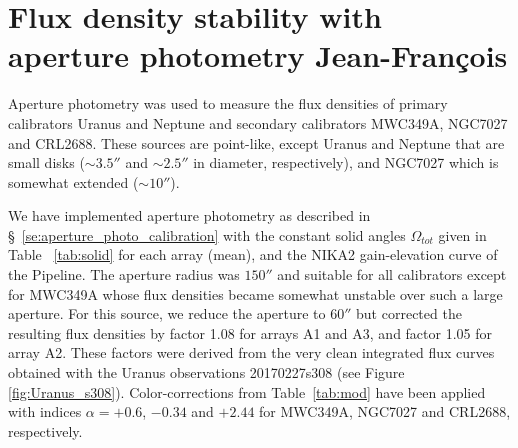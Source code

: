 
%





\section{Flux density stability with aperture photometry {\color{green} Jean-Fran\c cois}}
\label{se:aperture_photometry}

 
Aperture photometry was used to measure the flux densities of  primary calibrators Uranus and Neptune
and  secondary calibrators MWC349A, NGC7027 and CRL2688.   These
sources are point-like, except Uranus and Neptune that are small disks
($\sim 3.5''$ and $\sim 2.5''$ in diameter, respectively), and NGC7027 which is somewhat
extended ($\sim 10''$).

We have implemented aperture photometry as described in
\S~\ref{se:aperture_photo_calibration} with the constant solid
angles $\Omega_{tot}$ given in Table ~\ref{tab:solid} for each array (mean), and the
NIKA2 gain-elevation curve of the Pipeline. The aperture radius was
$150''$ and suitable for all calibrators except for MWC349A
whose flux densities became somewhat unstable over such a large
aperture. For this source, we reduce the aperture to $60''$ but
corrected the resulting flux densities by factor 1.08 for arrays A1
and A3, and factor 1.05 for array A2. These factors were derived from the very clean integrated flux
curves obtained with the Uranus observations 20170227s308 (see Figure \ref{fig:Uranus_s308}).  
Color-corrections from Table~\ref{tab:mod}   have been applied
with indices $\alpha=+0.6$, $-0.34$ and $+2.44$ for MWC349A, NGC7027
and CRL2688, respectively.

